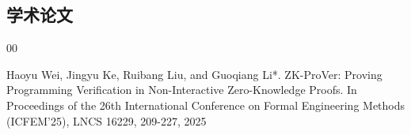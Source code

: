 
\begin{achievements}

  \subsection*{学术论文}


  \begin{bibliolist}{00}
    \item Haoyu Wei, Jingyu Ke, Ruibang Liu, and Guoqiang Li*. ZK-ProVer: Proving Programming Verification in Non-Interactive Zero-Knowledge Proofs. In Proceedings of the 26th International Conference on Formal Engineering Methods (ICFEM'25), LNCS 16229, 209-227, 2025
  \end{bibliolist}

\end{achievements}
